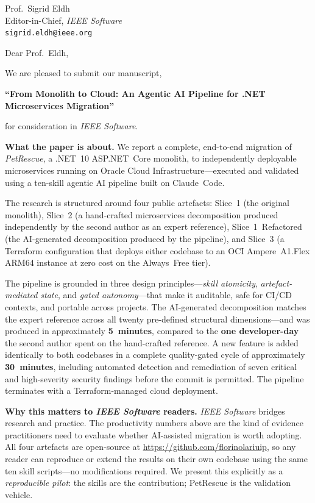 \documentclass[11pt, a4paper]{letter}
\date{\today}
\begin{document}
\begin{letter}{%
  Prof.\ Sigrid Eldh\\
  Editor-in-Chief, \textit{IEEE Software}\\
  \texttt{sigrid.eldh@ieee.org}
}

\opening{Dear Prof.\ Eldh,}

We are pleased to submit our manuscript,

\begin{center}
  \textbf{``From Monolith to Cloud: An Agentic AI Pipeline
  for .NET Microservices Migration''}
\end{center}

for consideration in \textit{IEEE Software}.

\textbf{What the paper is about.}
We report a complete, end-to-end migration of \textit{PetRescue}, a
.NET~10 ASP.NET~Core monolith, to independently deployable
microservices running on Oracle Cloud Infrastructure---executed and
validated using a ten-skill agentic AI pipeline built on Claude~Code.

The research is structured around four public artefacts: Slice~1 (the
original monolith), Slice~2 (a hand-crafted microservices decomposition
produced independently by the second author as an expert reference),
Slice~1~Refactored (the AI-generated decomposition produced by the
pipeline), and Slice~3 (a Terraform configuration that deploys either
codebase to an OCI Ampere~A1.Flex ARM64 instance at zero cost on the
Always~Free tier).

The pipeline is grounded in three design principles---\emph{skill
atomicity}, \emph{artefact-mediated state}, and \emph{gated
autonomy}---that make it auditable, safe for CI/CD contexts, and
portable across projects.
The AI-generated decomposition matches the expert reference across all
twenty pre-defined structural dimensions---and was produced in
approximately \textbf{5~minutes}, compared to the \textbf{one
developer-day} the second author spent on the hand-crafted reference.
A new feature is added identically to both codebases in a complete
quality-gated cycle of approximately \textbf{30~minutes}, including
automated detection and remediation of seven critical and high-severity
security findings before the commit is permitted.
The pipeline terminates with a Terraform-managed cloud deployment.

\textbf{Why this matters to \textit{IEEE Software} readers.}
\textit{IEEE Software} bridges research and practice.  The productivity
numbers above are the kind of evidence practitioners need to evaluate
whether AI-assisted migration is worth adopting.  All four artefacts
are open-source at \url{https://github.com/florinolariuip}, so any
reader can reproduce or extend the results on their own codebase using
the same ten skill scripts---no modifications required.  We present
this explicitly as a \emph{reproducible pilot}: the skills are the
contribution; PetRescue is the validation vehicle.


\end{letter}
\end{document}
